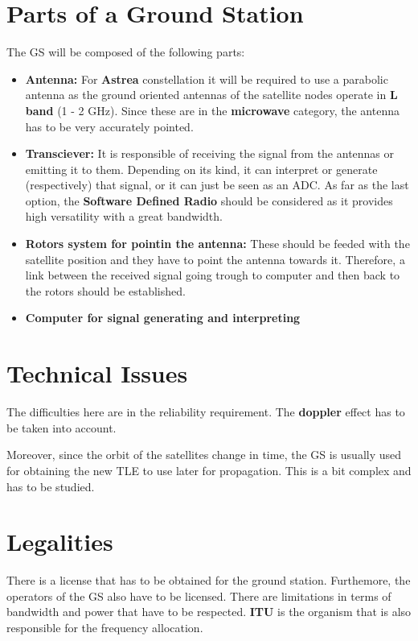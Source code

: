 \documentclass[12pt,a4paper]{article}
\begin{document}
\section{Parts of a Ground Station}
The GS will be composed of the following parts:
\begin{itemize}
\item \textbf{Antenna:} For \textbf{Astrea} constellation it will be required to use a parabolic antenna as the ground oriented antennas of the satellite nodes operate in \textbf{L band} (1 - 2 GHz). Since these are in the \textbf{microwave} category, the antenna has to be very accurately pointed.
\item \textbf{Transciever:} It is responsible of receiving the signal from the antennas or emitting it to them. Depending on its kind, it can interpret or generate (respectively) that signal, or it can just be seen as an ADC. As far as the last option, the \textbf{Software Defined Radio} should be considered as it provides high versatility with a great bandwidth.
\item \textbf{Rotors system for pointin the antenna:} These should be feeded with the satellite position and they have to point the antenna towards it. Therefore, a link between the received signal going trough to computer and then back to the rotors should be established.
\item \textbf{Computer for signal generating and interpreting}
\end{itemize}

\section{Technical Issues}
The difficulties here are in the reliability requirement. The \textbf{doppler} effect has to be taken into account.

Moreover, since the orbit of the satellites change in time, the GS is usually used for obtaining the new TLE to use later for propagation. This is a bit complex and has to be studied.

\section{Legalities}
There is a license that has to be obtained for the ground station.
Furthemore, the operators of the GS also have to be licensed.
There are limitations in terms of bandwidth and power that have to be respected. \textbf{ITU} is the organism that is also responsible for the frequency allocation.
\end{document}
